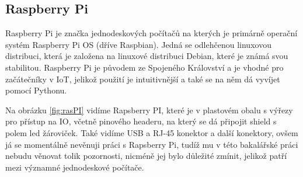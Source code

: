 
\subsection{Raspberry Pi}
Raspberry Pi je značka jednodeskových počítačů na kterých je primárně operační systém Raspberry Pi OS (dříve Raspbian). Jedná se odlehčenou linuxovou distribuci, která je založena na linuxové distribuci Debian, které je známá svou stabilitou. Raspberry Pi je původem ze Spojeného Království a je vhodné pro začátečníky v IoT, jelikož použití je intuitivnější a také se na něm dá vyvíjet pomocí Pythonu.


Na obrázku \ref{fig:rasPI} vidíme Rapsberry PI, které je v plastovém obalu s výřezy pro přístup na IO, včetně pinového headeru, na který se dá připojit shield s polem led žároviček. Také vidíme USB a RJ-45 konektor a další konektory, ovšem já se momentálně nevěnuji práci s Rapsberry Pi, tudíž mu v této bakalářské práci nebudu věnovat tolik pozornosti, nicméně jej bylo důležité zmínit, jelikož patří mezi významné jednodeskové počítače.